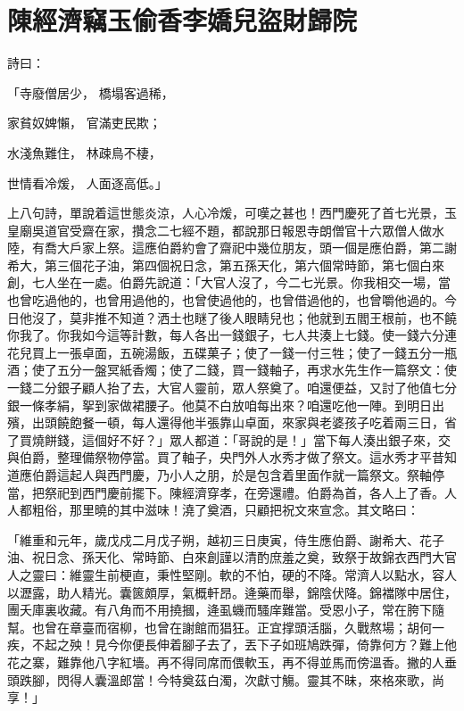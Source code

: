 %

\chapter{陳經濟竊玉偷香\KG 李嬌兒盜財歸院}

詩曰：

「寺廢僧居少，  橋塌客過稀，

家貧奴婢懶，  官滿吏民欺；

水淺魚難住，  林疎鳥不棲，

世情看冷煖，  人面逐高低。」

上八句詩，單說着這世態炎涼，人心冷煖，可嘆之甚也！西門慶死了首七光景，玉皇廟吳道官受齋在家，攢念二七經不題，都說那日報恩寺朗僧官十六眾僧人做水陸，有喬大戶家上祭。這應伯爵約會了齋祀中幾位朋友，頭一個是應伯爵，第二謝希大，第三個花子油，第四個祝日念，第五孫天化，第六個常時節，第七個白來創，七人坐在一處。伯爵先說道：「大官人沒了，今二七光景。你我相交一場，當也曾吃過他的，也曾用過他的，也曾使過他的，也曾借過他的，也曾嚼他過的。今日他沒了，莫非推不知道？洒土也瞇了後人眼睛兒也；他就到五閻王根前，也不饒你我了。你我如今這等計數，每人各出一錢銀子，七人共湊上七錢。使一錢六分連花兒買上一張卓面，五碗湯飯，五碟菓子；使了一錢一付三牲；使了一錢五分一瓶酒；使了五分一盤冥紙香燭；使了二錢，買一錢軸子，再求水先生作一篇祭文：使一錢二分銀子顧人抬了去，大官人靈前，眾人祭奠了。咱還便益，又討了他值七分銀一條孝絹，挐到家做裙腰子。他莫不白放咱每出來？咱還吃他一陣。到明日出殯，出頭饒飽餐一頓，每人還得他半張靠山卓面，來家與老婆孩子吃着兩三日，省了買燒餅錢，這個好不好？」眾人都道：「哥說的是！」當下每人湊出銀子來，交與伯爵，整理備祭物停當。買了軸子，央門外人水秀才做了祭文。這水秀才平昔知道應伯爵這起人與西門慶，乃小人之朋，於是包含着里面作就一篇祭文。祭軸停當，把祭祀到西門慶前擺下。陳經濟穿孝，在旁還禮。伯爵為首，各人上了香。人人都粗俗，那里曉的其中滋味！澆了奠酒，只顧把祝文來宣念。其文略曰：

「維重和元年，歲戊戍二月戊子朔，越初三日庚寅，侍生應伯爵、謝希大、花子油、祝日念、孫天化、常時節、白來創謹以清酌庶羞之奠，致祭于故錦衣西門大官人之靈曰：維靈生前梗直，秉性堅剛。軟的不怕，硬的不降。常濟人以點水，容人以瀝露，助人精光。囊篋頗厚，氣概軒昂。逄藥而舉，錦陰伏降。錦襠隊中居住，團夭庫裏收藏。有八角而不用撓摑，逄虱蟣而騷庠難當。受恩小子，常在胯下隨幫。也曾在章臺而宿柳，也曾在謝館而猖狂。正宜撑頭活腦，久戰熬場；胡何一疾，不起之殃！見今你便長伸着腳子去了，丟下子如班鳩跌彈，倚靠何方？難上他花之寨，難靠他八字紅墻。再不得同席而偎軟玉，再不得並馬而傍溫香。撇的人垂頭跌腳，閃得人囊溫郎當！今特奠茲白濁，次獻寸觴。靈其不昧，來格來歌，尚享！」

